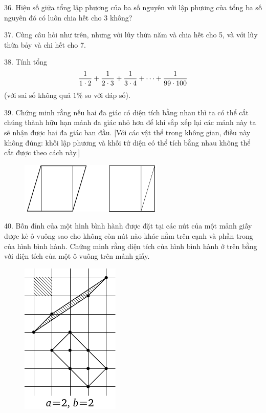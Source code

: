 \begin{problem}{36.}
	Hiệu số giữa tổng lập phương của ba số nguyên với lập phương của tổng ba số nguyên đó có luôn chia hết cho 3 không?
\end{problem}

\begin{problem}{37.}
	Cùng câu hỏi như trên, nhưng với lũy thừa năm và chia hết cho 5, và với lũy thừa bảy và chi hết cho 7.
\end{problem}

\begin{problem}{38.}
	Tính tổng
	$$ \dfrac{1}{1\cdot 2} + \dfrac{1}{2\cdot 3}+\dfrac{1}{3\cdot 4}+ \cdots + \dfrac{1}{99\cdot 100} $$
	(với sai số không quá $1\%$ so với đáp số).
\end{problem}

\begin{problem}{39.}
	Chứng minh rằng nếu hai đa giác có diện tích bằng nhau thì ta có thể cắt chúng thành hữu hạn mảnh đa giác nhỏ hơn để  khi sắp xếp lại các mảnh này ta sẽ nhận được hai đa giác ban đầu. [Với các vật thể trong không gian, điều này không đúng: khối lập phương và khối tứ diện có thể tích bằng nhau không thể cắt được theo cách này.]
	\begin{figure}
		\includegraphics{q39_horizontal}
	\end{figure}
\end{problem}

\begin{problem}{40.}
	Bốn đỉnh của một hình bình hành được đặt tại các nút của một mảnh giấy được kẻ ô vuông sao cho không còn nút nào khác nằm trên  cạnh và phần trong của hình bình hành. Chứng minh rằng diện tích của hình bình hành ở trên bằng với diện tích của một ô vuông trên mảnh giấy.
	\begin{figure}
		\includegraphics{taskbook-24}
	\end{figure}
\end{problem}

